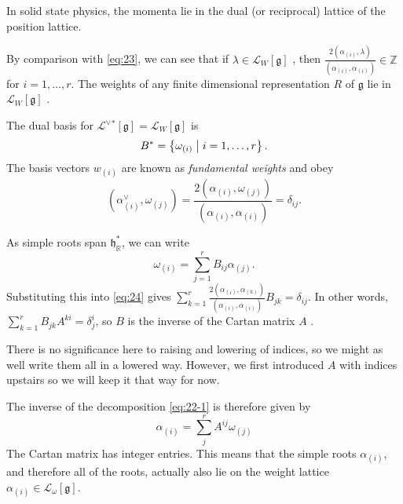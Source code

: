 \begin{example}[]
  In solid state physics, the momenta lie in the dual (or reciprocal) lattice of the position lattice.
\end{example}

By comparison with \eqref{eq:23}, we can see that if $\lambda \in \mathcal{L}_W[\mathfrak{g}]$ , then $\frac{2 (\alpha_{(i)}, \lambda)}{(\alpha_{(i)}, \alpha_{(i)})} \in \mathbb{Z}$ for $i = 1, \dots, r$.
The weights of any finite dimensional representation $R$ of $\mathfrak{g}$ lie in $\mathcal{L}_W[\mathfrak{g}]$ .

\begin{definition}[]
  The dual basis for $\mathcal{L}^{\vee}{}^* [\mathfrak{g}] = \mathcal{L}_W[\mathfrak{g}]$ is
  \begin{equation}
    B^* = \left\{ \omega_{(i)} \suchthat i = 1, \dots, r \right\}.
  \end{equation}
  The basis vectors $w_{(i)}$ are known as \emph{fundamental weights} and obey
  \begin{equation}
    \label{eq:24}
    (\alpha_{(i)}^\vee, \omega_{(j)}) = \frac{2 (\alpha_{(i)}, \omega_{(j)})}{(\alpha_{(i)}, \alpha_{(i)})} = \delta_{ij}.
  \end{equation}
\end{definition}

As simple roots span $\mathfrak{h}^*_{\mathbb{R}}$, we can write
\begin{equation}
  \label{eq:22-1}
  \omega_{(i)} = \sum_{j=1}^{r} B_{ij} \alpha_{(j)}.
\end{equation}
Substituting this into \eqref{eq:24} gives $\sum_{k=1}^{r} \frac{2(\alpha_{(i)}, \alpha_{(k)})}{(\alpha_{(i)}, \alpha_{(i)})} B_{jk} = \delta_{ij}$.
In other words, $\sum_{k=1}^{r} B_{jk} A^{ki} = \delta_{j}^{i}$, so $ B$ is the inverse of the Cartan matrix $A$ .
\begin{remark}
  There is no significance here to raising and lowering of indices, so we might as well write them all in a lowered way.
  However, we first introduced $A$ with indices upstairs so we will keep it that way for now.
\end{remark}
The inverse of the decomposition \eqref{eq:22-1} is therefore given by
\begin{equation}
  \boxed{\alpha_{(i)} = \sum_{j}^{r} A^{ij} \omega_{(j)}}
\end{equation}
The Cartan matrix has integer entries.
This means that the simple roots $\alpha_{(i)}$, and therefore all of the roots, actually also lie on the weight lattice $\alpha_{(i)} \in \mathcal{L}_{\omega} [\mathfrak{g}]$.


